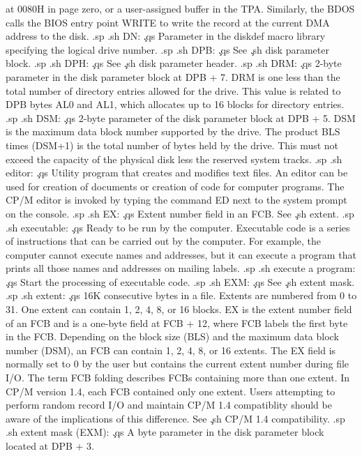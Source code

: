 at 0080H in page zero, or a user-assigned buffer in the TPA.  
Similarly, the BDOS calls the BIOS entry point WRITE to write the 
record at the current DMA address to the disk.
.sp
.sh
DN:  \c
.qs
Parameter in the diskdef macro library specifying the logical 
drive number.
.sp
.sh
DPB:  \c
.qs
See \c
.sh
disk parameter block.
.sp
.sh
DPH:  \c
.qs
See \c
.sh
disk parameter header.
.sp
.sh
DRM:  \c
.qs
2-byte parameter in the disk parameter block at DPB + 7.  DRM is 
one less than the total number of directory entries allowed for 
the drive.  This value is related to DPB bytes AL0 and AL1, which 
allocates up to 16 blocks for directory entries.
.sp
.sh
DSM:  \c
.qs
2-byte parameter of the disk parameter block at DPB + 5.  DSM is 
the maximum data block number supported by the drive.  The 
product BLS times (DSM+1) is the total number of bytes held by 
the drive.  This must not exceed the capacity of the physical 
disk less the reserved system tracks.
.sp
.sh
editor:  \c
.qs
Utility program that creates and modifies text files.  An editor 
can be used for creation of documents or creation of code for 
computer programs.  The CP/M editor is invoked by typing the 
command ED next to the system prompt on the console.
.sp
.sh
EX:  \c
.qs
Extent number field in an FCB.  See \c
.sh
extent.
.sp
.sh
executable:  \c
.qs
Ready to be run by the computer.  Executable code is a series of 
instructions that can be carried out by the computer.  For 
example, the computer cannot execute names and addresses, but it 
can execute a program that prints all those names and addresses 
on mailing labels.
.sp
.sh
execute a program:  \c
.qs
Start the processing of executable code.
.sp
.sh
EXM:  \c
.qs
See \c
.sh
extent mask.
.sp
.sh
extent:  \c
.qs
16K consecutive bytes in a file.  Extents are numbered from 0 to 
31.  One extent can contain 1, 2, 4, 8, or 16 blocks.  EX is the 
extent number field of an FCB and is a one-byte field at FCB + 
12, where FCB labels the first byte in the FCB.  Depending on the 
block size (BLS) and the maximum data block number (DSM), an FCB 
can contain 1, 2, 4, 8, or 16 extents.  The EX field is normally 
set to 0 by the user but contains the current extent number 
during file I/O.  The term FCB folding describes FCBs containing 
more than one extent.  In CP/M version 1.4, each FCB contained 
only one extent.  Users attempting to perform random record I/O 
and maintain CP/M 1.4 compatiblity should be aware of the 
implications of this difference.  See \c
.sh
CP/M 1.4 compatibility.
.sp
.sh
extent mask (EXM):  \c
.qs
A byte parameter in the disk parameter block located at DPB + 3.  
